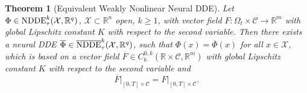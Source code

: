 \documentclass[10pt]{article}
\numberwithin{equation}{section}
\newtheorem{theorem}{Theorem}[section]
\begin{document}
	
	
	\begin{theorem}[Equivalent Weakly Nonlinear Neural DDE] \label{th:NDDEextended}
		Let $\Phi \in \textup{NDDE}_\tau^k(\mathcal{X},\mathbb{R}^q)$, $\mathcal{X}\subset \mathbb{R}^n$ open, $k\geq1$, with vector field $F:\Omega_t \times \mathcal{C}\rightarrow \mathbb{R}^m$ with global Lipschitz constant $K$ with respect to the second variable. Then there exists a neural DDE $\overline{\Phi}\in \overline{\textup{NDDE}}_\tau^k(\mathcal{X},\mathbb{R}^q)$, such that  $\Phi(x) = \overline{\Phi}(x)$ for all $x \in \mathcal{X}$, which is based on a vector field $\overline{F}\in C_b^{0,k}(\mathbb{R}\times \mathcal{C},\mathbb{R}^m)$ with global Lipschitz constant $K$ with respect to the second variable and $$\overline{F}\big\vert_{[0,T]\times \mathcal{C}}= F\big\vert_{[0,T]\times \mathcal{C}}.$$
	\end{theorem}
	
\end{document}
